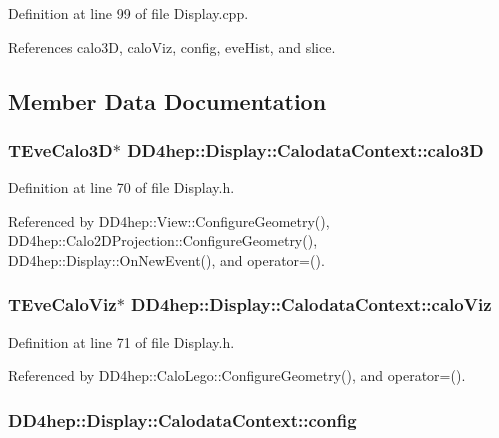 Definition at line 99 of file Display.cpp.

References calo3D, caloViz, config, eveHist, and slice.

\subsection{Member Data Documentation}
\hypertarget{struct_d_d4hep_1_1_display_1_1_calodata_context_a61ac4175d05d258cc57210d2100c0663}{
\subsubsection[{calo3D}]{\setlength{\rightskip}{0pt plus 5cm}TEveCalo3D$\ast$ {\bf DD4hep::Display::CalodataContext::calo3D}}}
\label{struct_d_d4hep_1_1_display_1_1_calodata_context_a61ac4175d05d258cc57210d2100c0663}


Definition at line 70 of file Display.h.

Referenced by DD4hep::View::ConfigureGeometry(), DD4hep::Calo2DProjection::ConfigureGeometry(), DD4hep::Display::OnNewEvent(), and operator=().\hypertarget{struct_d_d4hep_1_1_display_1_1_calodata_context_af3730c667ed35846cfeb83eb21410cca}{
\subsubsection[{caloViz}]{\setlength{\rightskip}{0pt plus 5cm}TEveCaloViz$\ast$ {\bf DD4hep::Display::CalodataContext::caloViz}}}
\label{struct_d_d4hep_1_1_display_1_1_calodata_context_af3730c667ed35846cfeb83eb21410cca}


Definition at line 71 of file Display.h.

Referenced by DD4hep::CaloLego::ConfigureGeometry(), and operator=().\hypertarget{struct_d_d4hep_1_1_display_1_1_calodata_context_ad05be864371ffba5b06eadcb9be8511b}{
\subsubsection[{config}]{ {\bf DD4hep::Display::CalodataContext::config}}}
\label{struct_d_d4hep_1_1_display_1_1_calodata_context_ad05be864371ffba5b06eadcb9be8511b}


